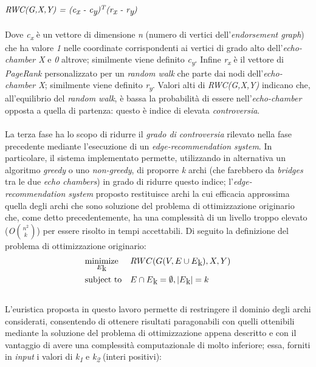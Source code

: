 \\\\
$\textit{RWC(G,X,Y) = (c\textsubscript{x} - c\textsubscript{y})\textsuperscript{T}(r\textsubscript{x} - r\textsubscript{y})}$
\\\\Dove \textit{c\textsubscript{x}} è un vettore di dimensione \textit{n} (numero di vertici dell'\textit{endorsement graph}) che ha valore \textit{1} nelle coordinate corrispondenti ai vertici di grado alto dell'\textit{echo-chamber X} e \textit{0} altrove; similmente viene definito \textit{c\textsubscript{y}}. Infine \textit{r\textsubscript{x}} è il vettore di \textit{PageRank} personalizzato per un \textit{random walk} che parte dai nodi dell'\textit{echo-chamber X}; similmente viene definito \textit{r\textsubscript{y}}. Valori alti di \textit{RWC(G,X,Y)} indicano che, all'equilibrio del \textit{random walk}, è bassa la probabilità di essere nell'\textit{echo-chamber} opposta a quella di partenza: questo è indice di elevata \textit{controversia}. 
\\\\La terza fase ha lo scopo di ridurre il \textit{grado di controversia} rilevato nella fase precedente mediante l'esecuzione di un \textit{edge-recommendation system}. In particolare, il sistema implementato permette, utilizzando in alternativa un algoritmo \textit{greedy} o uno \textit{non-greedy}, di proporre \textit{k} archi (che farebbero da \textit{bridges} tra le due \textit{echo chambers}) in grado di ridurre questo indice; l'\textit{edge-recommendation system} proposto restituisce archi la cui efficacia approssima quella degli archi che sono soluzione del problema di ottimizzazione originario che, come detto precedentemente, ha una complessità di un livello troppo elevato (\textit{O}${n^2\choose k}$) per essere risolto in tempi accettabili. Di seguito la definizione del problema di ottimizzazione originario:
\\
\begin{equation*}
\begin{aligned}
& \underset{E\textsubscript{k}}{\text{minimize}}
& & RWC(G(V, E \cup E\textsubscript{k}),X,Y) \\
& \text{subject to}
& & E \cap E\textsubscript{k} = \emptyset, \left|{E\textsubscript{k}}\right| = k
\end{aligned}
\end{equation*}
\\
L'euristica proposta in questo lavoro permette di restringere il dominio degli archi considerati, consentendo di ottenere risultati paragonabili con quelli ottenibili mediante la soluzione del problema di ottimizzazione appena descritto e con il vantaggio di avere una complessità computazionale di molto inferiore; essa, forniti in \textit{input} i valori di \textit{k\textsubscript{1}} e \textit{k\textsubscript{2}} (interi positivi):
